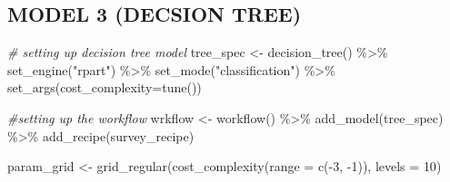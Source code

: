 \documentclass[
]{article}
\newenvironment{Shaded}{\begin{snugshade}}{\end{snugshade}}
\newcommand{\AttributeTok}[1]{\textcolor[rgb]{0.77,0.63,0.00}{#1}}
\newcommand{\CommentTok}[1]{\textcolor[rgb]{0.56,0.35,0.01}{\textit{#1}}}
\newcommand{\DecValTok}[1]{\textcolor[rgb]{0.00,0.00,0.81}{#1}}
\newcommand{\FunctionTok}[1]{\textcolor[rgb]{0.00,0.00,0.00}{#1}}
\newcommand{\NormalTok}[1]{#1}
\newcommand{\OtherTok}[1]{\textcolor[rgb]{0.56,0.35,0.01}{#1}}
\newcommand{\SpecialCharTok}[1]{\textcolor[rgb]{0.00,0.00,0.00}{#1}}
\newcommand{\StringTok}[1]{\textcolor[rgb]{0.31,0.60,0.02}{#1}}
\begin{document}
\begin{Shaded}
\end{Shaded}

\hypertarget{model-3-decsion-tree}{%
\subsection{MODEL 3 (DECSION TREE)}\label{model-3-decsion-tree}}

\begin{Shaded}
\begin{Highlighting}[]
\CommentTok{\# setting up decision tree model}
\NormalTok{tree\_spec }\OtherTok{\textless{}{-}} \FunctionTok{decision\_tree}\NormalTok{() }\SpecialCharTok{\%\textgreater{}\%}
  \FunctionTok{set\_engine}\NormalTok{(}\StringTok{"rpart"}\NormalTok{) }\SpecialCharTok{\%\textgreater{}\%}
  \FunctionTok{set\_mode}\NormalTok{(}\StringTok{"classification"}\NormalTok{) }\SpecialCharTok{\%\textgreater{}\%}
  \FunctionTok{set\_args}\NormalTok{(}\AttributeTok{cost\_complexity=}\FunctionTok{tune}\NormalTok{())}

\CommentTok{\#setting up the workflow}
\NormalTok{wrkflow }\OtherTok{\textless{}{-}} \FunctionTok{workflow}\NormalTok{() }\SpecialCharTok{\%\textgreater{}\%}
  \FunctionTok{add\_model}\NormalTok{(tree\_spec) }\SpecialCharTok{\%\textgreater{}\%}
  \FunctionTok{add\_recipe}\NormalTok{(survey\_recipe)}

\NormalTok{param\_grid }\OtherTok{\textless{}{-}} \FunctionTok{grid\_regular}\NormalTok{(}\FunctionTok{cost\_complexity}\NormalTok{(}\AttributeTok{range =} \FunctionTok{c}\NormalTok{(}\SpecialCharTok{{-}}\DecValTok{3}\NormalTok{, }\SpecialCharTok{{-}}\DecValTok{1}\NormalTok{)), }\AttributeTok{levels =} \DecValTok{10}\NormalTok{)}
\end{Highlighting}
\end{Shaded}
\end{document}

